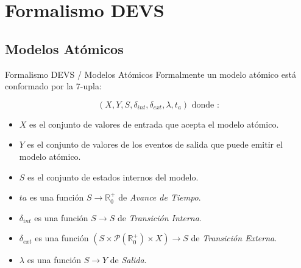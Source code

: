 \documentclass{beamer}
\begin{document}

\section{Formalismo DEVS}
\subsection{Modelos Atómicos}
\begin{frame}{Formalismo DEVS / Modelos Atómicos}
	Formalmente un modelo atómico está conformado por la 7-upla:

	\begin{equation} 
	(X, Y, S, \delta_{int} , \delta_{ext}, \lambda, t_{a}) \mbox{ donde :}
	\end{equation}

	\begin{itemize}
	\item<1-> $X$ es el conjunto de valores de entrada que acepta el modelo atómico.
	\item<2-> $Y$ es el conjunto de valores de los eventos de salida que puede emitir el modelo atómico.
	\item<3-> $S$ es el conjunto de estados internos del modelo.
	\item<4-> $ta$ es una función $S \to \mathbb{R}^{+}_{0}$ de \emph{Avance de Tiempo}.
	\item<5-> $\delta_{int}$ es una función $S \to S$ de \emph{Transición Interna}.
	\item<6-> $\delta_{ext}$ es una función $(S \times \mathcal{P}(\mathbb{R}^{+}_{0}) \times X) \to S$ de \emph{Transición Externa}.
	\item<7-> $\lambda$ es una función $S \to Y$ de \emph{Salida}.
	\end{itemize}
\end{frame}
\end{document}
